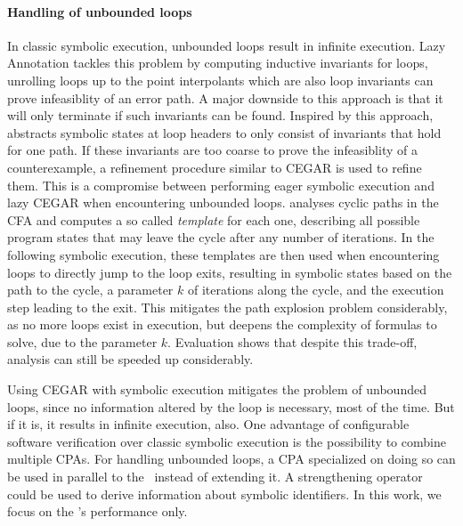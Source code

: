 \paragraph*{Handling of unbounded loops}
In classic symbolic execution, unbounded loops result in infinite execution.
Lazy Annotation \cite{McMillan2010} tackles this problem by computing inductive invariants for loops, unrolling loops up to the point interpolants which are also loop invariants can prove infeasiblity of an error path.
A major downside to this approach is that it will only terminate if such invariants can be found.
Inspired by this approach, \cite{Jaffar2012} abstracts symbolic states at loop headers to only consist of invariants that hold for one path.
If these invariants are too coarse to prove the infeasiblity of a counterexample, a refinement procedure similar to CEGAR is used to refine them.
This is a compromise between performing eager symbolic execution and lazy CEGAR when encountering unbounded loops.
\cite{Slaby2013} analyses cyclic paths in the CFA and computes a so called \emph{template} for each one,
describing all possible program states that may leave the cycle after any number of iterations.
In the following symbolic execution, these templates are then used when encountering loops to directly jump to the loop exits, resulting in symbolic states based on the path to the cycle, a parameter $k$ of iterations along the cycle, and the execution step leading to the exit.
This mitigates the path explosion problem considerably, as no more loops exist in execution, but deepens the complexity of formulas to solve, due to the parameter $k$.
Evaluation shows that despite this trade-off, analysis can still be speeded up considerably.

Using CEGAR with symbolic execution mitigates the problem of unbounded loops, since no information altered by the loop is necessary, most of the time.
But if it is, it results in infinite execution, also.
One advantage of configurable software verification over classic symbolic execution is the possibility to combine multiple CPAs.
For handling unbounded loops, a CPA specialized on doing so can be used in parallel to the \symbolicExecutionCPA\ instead of extending it.
A strengthening operator could be used to derive information about symbolic identifiers.
In this work, we focus on the \symbolicExecutionCPA's performance only.

